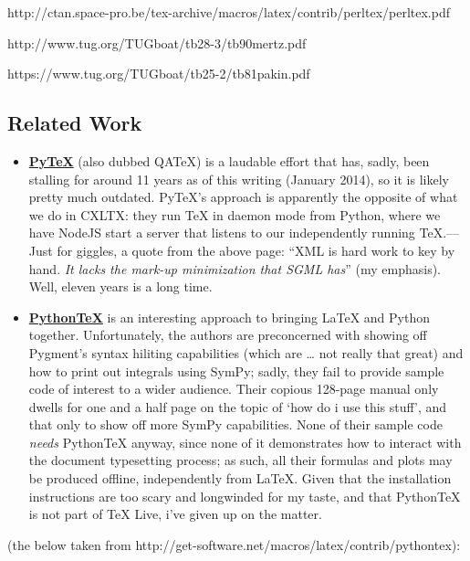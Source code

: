 http://ctan.space-pro.be/tex-archive/macros/latex/contrib/perltex/perltex.pdf

http://www.tug.org/TUGboat/tb28-3/tb90mertz.pdf

https://www.tug.org/TUGboat/tb25-2/tb81pakin.pdf

\subsection{Related Work}\label{related-work}

\begin{itemize}
\item
  \href{http://www.pytex.org/}{\textbf{PyTeX}} (also dubbed QATeX) is a
  laudable effort that has, sadly, been stalling for around 11 years as
  of this writing (January 2014), so it is likely pretty much outdated.
  PyTeX's approach is apparently the opposite of what we do in CXLTX:
  they run TeX in daemon mode from Python, where we have NodeJS start a
  server that listens to our independently running TeX.---Just for
  giggles, a quote from the above page: ``XML is hard work to key by
  hand. \emph{It lacks the mark-up minimization that SGML has}'' (my
  emphasis). Well, eleven years is a long time.
\item
  \href{https://github.com/gpoore/pythontex}{\textbf{PythonTeX}} is an
  interesting approach to bringing LaTeX and Python together.
  Unfortunately, the authors are preconcerned with showing off Pygment's
  syntax hiliting capabilities (which are \ldots{} not really that
  great) and how to print out integrals using SymPy; sadly, they fail to
  provide sample code of interest to a wider audience. Their copious
  128-page manual only dwells for one and a half page on the topic of
  `how do i use this stuff', and that only to show off more SymPy
  capabilities. None of their sample code \emph{needs} PythonTeX anyway,
  since none of it demonstrates how to interact with the document
  typesetting process; as such, all their formulas and plots may be
  produced offline, independently from LaTeX. Given that the
  installation instructions are too scary and longwinded for my taste,
  and that PythonTeX is not part of TeX Live, i've given up on the
  matter.
\end{itemize}

(the below taken from
http://get-software.net/macros/latex/contrib/pythontex):

